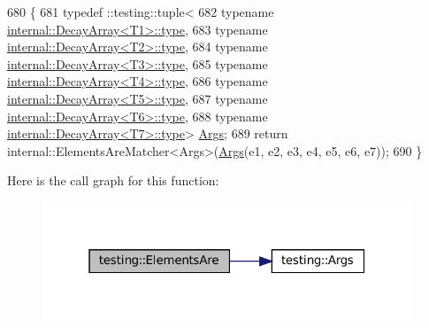 \begin{DoxyCode}
680                                               \{
681   typedef ::testing::tuple<
682       \textcolor{keyword}{typename} \hyperlink{namespacegenerate__debs_a50bc9a7ecac9584553e089a448bcde58}{internal::DecayArray<T1>::type},
683       \textcolor{keyword}{typename} \hyperlink{namespacegenerate__debs_a50bc9a7ecac9584553e089a448bcde58}{internal::DecayArray<T2>::type},
684       \textcolor{keyword}{typename} \hyperlink{namespacegenerate__debs_a50bc9a7ecac9584553e089a448bcde58}{internal::DecayArray<T3>::type},
685       \textcolor{keyword}{typename} \hyperlink{namespacegenerate__debs_a50bc9a7ecac9584553e089a448bcde58}{internal::DecayArray<T4>::type},
686       \textcolor{keyword}{typename} \hyperlink{namespacegenerate__debs_a50bc9a7ecac9584553e089a448bcde58}{internal::DecayArray<T5>::type},
687       \textcolor{keyword}{typename} \hyperlink{namespacegenerate__debs_a50bc9a7ecac9584553e089a448bcde58}{internal::DecayArray<T6>::type},
688       \textcolor{keyword}{typename} \hyperlink{namespacegenerate__debs_a50bc9a7ecac9584553e089a448bcde58}{internal::DecayArray<T7>::type}> 
      \hyperlink{namespacetesting_a09ac462e8d6ed468cbfaa9c767aee0aa}{Args};
689   \textcolor{keywordflow}{return} internal::ElementsAreMatcher<Args>(\hyperlink{namespacetesting_a09ac462e8d6ed468cbfaa9c767aee0aa}{Args}(e1, e2, e3, e4, e5, e6, e7));
690 \}
\end{DoxyCode}
Here is the call graph for this function\+:
\nopagebreak
\begin{figure}[H]
\begin{center}
\leavevmode
\includegraphics[width=313pt]{namespacetesting_a3af9f549d951a4961825f821e6d47da9_cgraph}
\end{center}
\end{figure}
\mbox{\label{namespacetesting_a8d498031827c1d089dc84f5f14b7df12}} 
